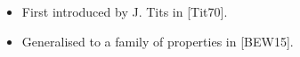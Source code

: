 \documentclass[preview]{standalone}
\begin{document}
\begin{center}
\begin{itemize} \item First introduced by J. Tits in [Tit70]. \item Generalised to a family of properties in [BEW15]. \end{itemize}
\end{center}
\end{document}
